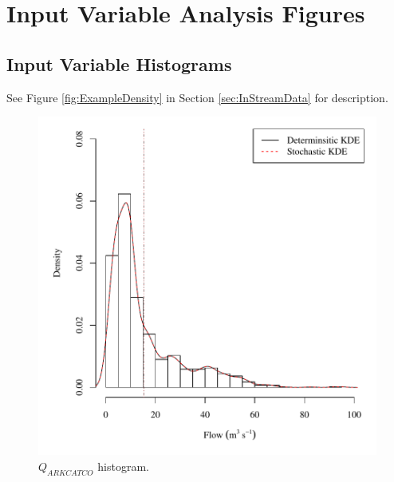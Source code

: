 \renewcommand{\thechapter}{A}

\chapter{Input Variable Analysis Figures}

\section{Input Variable Histograms}
\label{App:VarDensity}
\vspace{12pt}
See Figure \ref{fig:ExampleDensity} in Section \ref{sec:InStreamData} for description.

\begin{center}
\begin{figure}[htbp]
	\includegraphics[width=6in]{"Figures/Results_USR/V density qin"}
	\caption{$Q_{ARKCATCO}$ histogram.}
\end{figure}
\end{center}
\newpage

